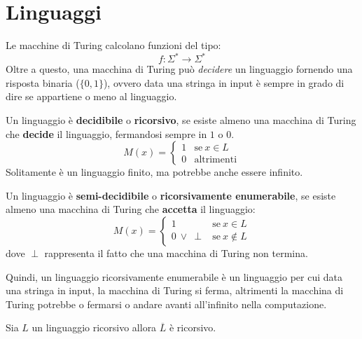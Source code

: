\section{Linguaggi}
Le macchine di Turing calcolano funzioni del tipo:
\begin{equation}
    f: \Sigma^{\ast} \to \Sigma^{\ast}
\end{equation}
Oltre a questo, una macchina di Turing può \textit{decidere} un linguaggio
fornendo una risposta binaria ($\{0, 1\}$), ovvero data una stringa in input è
sempre in grado di dire se appartiene o meno al linguaggio.
\begin{definizione}
    Un linguaggio è \textbf{decidibile} o \textbf{ricorsivo}, se esiste almeno
    una macchina di Turing che \textbf{decide} il linguaggio, fermandosi sempre
    in $1$ o $0$.
    \begin{equation}
        M(x) = \begin{cases}
            1 & \text{se} \ x \in L \\
            0 & \text{altrimenti}
        \end{cases}
    \end{equation}
    Solitamente è un linguaggio finito, ma potrebbe anche essere infinito.
\end{definizione}
\begin{definizione}
    Un linguaggio è \textbf{semi-decidibile} o \textbf{ricorsivamente enumerabile},
    se esiste almeno una macchina di Turing che \textbf{accetta} il linguaggio:
    \begin{equation}
        M(x) = \begin{cases}
            1                & \text{se} \ x \in L     \\
            0 \ \lor \ \perp & \text{se} \ x \not\in L
        \end{cases}
    \end{equation}
    dove $\perp$ rappresenta il fatto che una macchina di Turing non termina.

    Quindi, un linguaggio ricorsivamente enumerabile è un linguaggio per cui data
    una stringa in input, la macchina di Turing si ferma, altrimenti la macchina
    di Turing potrebbe o fermarsi o andare avanti all'infinito nella computazione.
\end{definizione}
\begin{teorema}
    Sia $L$ un linguaggio ricorsivo allora $\overline{L}$ è ricorsivo.
\end{teorema}
